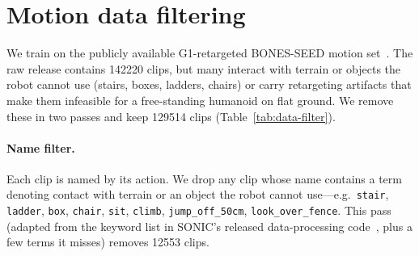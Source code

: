 \section{Motion data filtering}
\label{app:data-filter}

We train on the publicly available G1-retargeted BONES-SEED motion set~\citep{bones2026seed}. The raw
release contains \num{142220} clips, but many interact with terrain or objects the
robot cannot use (stairs, boxes, ladders, chairs) or carry retargeting artifacts
that make them infeasible for a free-standing humanoid on flat ground. We remove these
in two passes and keep \num{129514} clips (Table~\ref{tab:data-filter}).

\paragraph{Name filter.}
Each clip is named by its action. We drop any clip whose name contains a term
denoting contact with terrain or an object the robot cannot use---e.g.\
\texttt{stair}, \texttt{ladder}, \texttt{box}, \texttt{chair}, \texttt{sit},
\texttt{climb}, \texttt{jump\_off\_50cm}, \texttt{look\_over\_fence}. This pass
(adapted from the keyword list in SONIC's released data-processing
code~\citep{luo2025sonic}, plus a few terms it misses) removes
\num{12553} clips.

